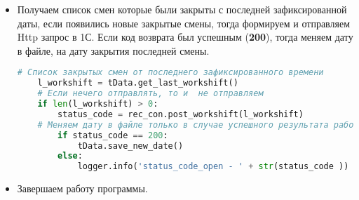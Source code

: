 \begin{itemize}
\newpage
\item Получаем список смен которые были закрыты с последней зафиксированной даты, если появились новые закрытые смены, тогда формируем и отправляем Http запрос в 1С. 
Если код возврата был успешным (\textbf{200}), тогда меняем дату в файле, на дату закрытия последней смены.
\newline
	\begin{lstlisting}[language=Python, caption=Закрытые смены]
	# Список закрытых смен от последнего зафиксированного времени
	l_workshift = tData.get_last_workshift()
	# Если нечего отправлять, то и  не отправляем
	if len(l_workshift) > 0:
		status_code = rec_con.post_workshift(l_workshift)
	# Меняем дату в файле только в случае успешного результата работы 1C
		if status_code == 200:
			tData.save_new_date()
		else:
			logger.info('status_code_open - ' + str(status_code ))
	\end{lstlisting}


\item Завершаем работу программы.




\end{itemize}

\newpage
